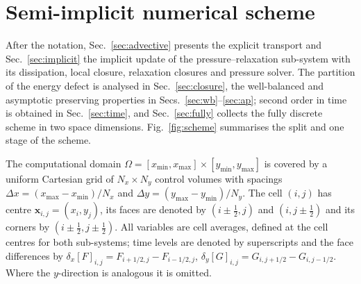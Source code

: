\documentclass[a4paper,fleqn]{cas-sc}
\begin{document}
\section{Semi-implicit numerical scheme}
\label{sec:method}

After the notation, Sec.~\ref{sec:advective} presents the explicit
transport and Sec.~\ref{sec:implicit} the implicit update of the pressure--relaxation sub-system with its
dissipation, local closure, relaxation closures and pressure solver. The partition of the energy defect is analysed in
Sec.~\ref{sec:closure}, the well-balanced and asymptotic preserving properties in Secs.~\ref{sec:wb}--\ref{sec:ap}; second order in time is obtained in Sec.~\ref{sec:time}, and
Sec.~\ref{sec:fully} collects the fully discrete scheme in two space dimensions.
Fig.~\ref{fig:scheme} summarises the split and one stage of the scheme.




The computational domain $\Omega=[x_{\min},x_{\max}]\times[y_{\min},y_{\max}]$ is covered by a uniform Cartesian grid of
$N_x\times N_y$ control volumes with spacings $\Delta x=(x_{\max}-x_{\min})/N_x$ and $\Delta y=(y_{\max}-y_{\min})/N_y$. The cell $(i,j)$ has
centre $\mathbf x_{i,j}=(x_i,y_j)$, its faces are denoted by $(i\pm\tfrac12,j)$ and $(i,j\pm\tfrac12)$ and its corners by
$(i\pm\tfrac12,j\pm\tfrac12)$. All variables are cell averages, defined at the cell centres for both sub-systems; time levels
are denoted by superscripts and the face differences by $\delta_x[F]_{i,j}=F_{i+1/2,j}-F_{i-1/2,j}$,
$\delta_y[G]_{i,j}=G_{i,j+1/2}-G_{i,j-1/2}$. Where the $y$-direction is analogous it is omitted.
\end{document}
